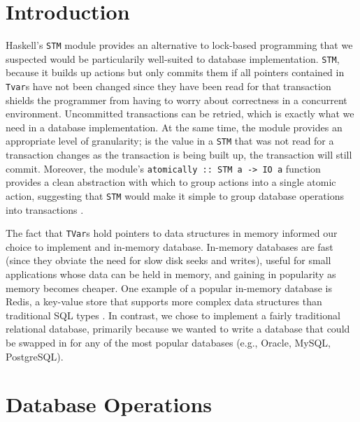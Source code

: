 \documentclass[10pt]{article}
\begin{document}
\vspace{5mm}
\begin{multicols}{2}

\section{Introduction} 
Haskell's \texttt{STM} module provides an alternative to lock-based programming that we suspected would be particularily well-suited to database implementation. \texttt{STM}, because it builds up actions but only commits them if all pointers contained in \texttt{Tvar}s have not been changed since they have been read for that transaction shields the programmer from having to worry about correctness in a concurrent environment. Uncommitted transactions can be retried, which is exactly what we need in a database implementation. At the same time, the module provides an appropriate level of granularity; is the value in a \texttt{STM} that was not read for a transaction changes as the transaction is being built up, the transaction will still commit. Moreover, the module's \texttt{atomically :: STM a -> IO a} function provides a clean abstraction with which to group actions into a single atomic action, suggesting that \texttt{STM} would make it simple to group database operations into transactions \cite{harris}. 

The fact that \texttt{TVar}s hold pointers to data structures in memory informed our choice to implement and in-memory database. In-memory databases are fast (since they obviate the need for slow disk seeks and writes), useful for small applications whose data can be held in memory, and gaining in popularity as memory becomes cheaper. One example of a popular in-memory database is Redis, a key-value store that supports more complex data structures than traditional SQL types \cite{redis}. In contrast, we chose to implement a fairly traditional relational database, primarily because we wanted to write a database that could be swapped in for any of the most popular databases (e.g., Oracle, MySQL, PostgreSQL). 

\section{Database Operations}

\end{multicols}
\end{document}
